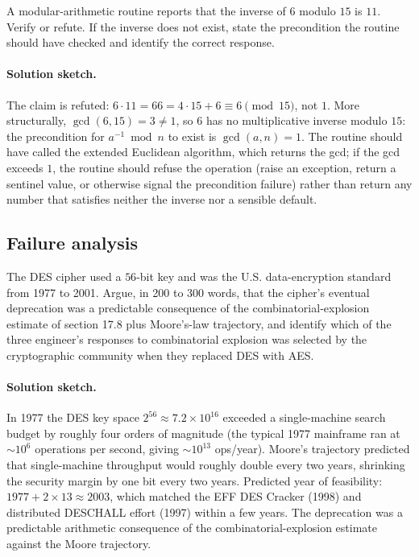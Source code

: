 \begin{exercise}
A modular-arithmetic routine reports that the inverse of $6$ modulo
$15$ is $11$. Verify or refute. If the inverse does not exist, state
the precondition the routine should have checked and identify the
correct response.
\end{exercise}

\paragraph{Solution sketch.}
The claim is refuted: $6 \cdot 11 = 66 = 4 \cdot 15 + 6 \equiv 6
\pmod{15}$, not $1$. More structurally, $\gcd(6, 15) = 3 \neq 1$,
so $6$ has no multiplicative inverse modulo $15$: the precondition
for $a^{-1} \bmod n$ to exist is $\gcd(a, n) = 1$. The routine
should have called the extended Euclidean algorithm, which returns
the gcd; if the gcd exceeds $1$, the routine should refuse the
operation (raise an exception, return a sentinel value, or
otherwise signal the precondition failure) rather than return any
number that satisfies neither the inverse nor a sensible default.

\subsection*{Failure analysis}

\begin{exercise}
The DES cipher used a $56$-bit key and was the U.S. data-encryption
standard from 1977 to 2001. Argue, in 200 to 300 words, that the
cipher's eventual deprecation was a predictable consequence of the
combinatorial-explosion estimate of section 17.8 plus Moore's-law
trajectory, and identify which of the three engineer's responses
to combinatorial explosion was selected by the cryptographic
community when they replaced DES with AES.
\end{exercise}

\paragraph{Solution sketch.}
In 1977 the DES key space $2^{56} \approx 7.2 \times 10^{16}$
exceeded a single-machine search budget by roughly four orders of
magnitude (the typical 1977 mainframe ran at $\sim 10^{6}$
operations per second, giving $\sim 10^{13}$ ops/year). Moore's
trajectory predicted that single-machine throughput would roughly
double every two years, shrinking the security margin by one bit
every two years. Predicted year of feasibility: $1977 + 2 \times 13
\approx 2003$, which matched the EFF DES Cracker (1998) and
distributed DESCHALL effort (1997) within a few years. The
deprecation was a predictable arithmetic consequence of the
combinatorial-explosion estimate against the Moore trajectory.

